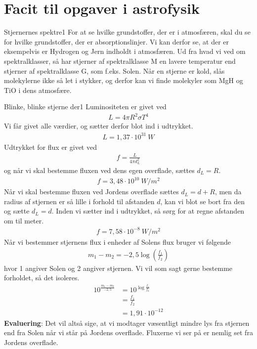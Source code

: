 \chapter{Facit til opgaver i astrofysik}

\begin{opgave}{Stjernernes spektre}{1}
\opg For at se hvilke grundstoffer, der er i atmosfæren, skal du se for hvilke grundstoffer, der er absorptionslinjer. Vi kan derfor se, at der er eksempelvis er Hydrogen og Jern indholdt i atmosfæren.
\opg Ud fra hvad vi ved om spektralklasser, så har stjerner af spektralklasse M en lavere temperatur end stjerner af spektralklasse G, som f.eks. Solen. Når en stjerne er kold, slås molekylerne ikke så let i stykker, og derfor kan vi finde molekyler som MgH og TiO i dens atmosfære. 
\end{opgave}



\begin{opgave}{Blinke, blinke stjerne der}{1}
  \opg Luminositeten er givet ved 
  \begin{align*}
  L = 4\pi R^2 \sigma T^4 
  \end{align*}
  Vi får givet alle værdier, og sætter derfor blot ind i udtrykket. 
  \begin{align*}
  L = 1,37 \cdot 10^{31}~\si{W}
  \end{align*}
  \opg Udtrykket for flux er givet ved 
  \begin{align*}
  f = \frac{L}{4\pi d_L^2}
  \end{align*}
  og når vi skal bestemme fluxen ved dens egen overflade, sættes $d_L = R$. 
  \begin{align*}
  f = 3,48\cdot 10^{10}~\si{W/m^2}
  \end{align*}
  \opg Når vi skal bestemme fluxen ved Jordens overflade sættes $d_L = d+R$, men da radius af stjernen er så lille i forhold til afstanden $d$, kan vi blot se bort fra den og sætte $d_L = d$. Inden vi sætter ind i udtrykket, så sørg for at regne afstanden om til meter.
  \begin{align*}
  f = 7,58\cdot 10^{-8}~\si{W/m^2}
  \end{align*}
  \opg Når vi bestemmer stjernens flux i enheder af Solens flux bruger vi følgende
  \begin{align*}
  m_1-m_2 = -2,5\log \left( \frac{f_1}{f_2} \right)
  \end{align*}
  hvor 1 angiver Solen og 2 angiver stjernen. Vi vil som sagt gerne bestemme forholdet, så det isoleres.  
  \begin{align*}
  10^{\frac{m_1-m_2}{-2,5}} &= 10^{\log \frac{f_1}{f_2}}\\
  &=\frac{f_1}{f_2}\\
  &=1,91\cdot 10^{-12}
  \end{align*}
  \textbf{Evaluering}: Det vil altså sige, at vi modtager væsentligt mindre lys fra stjernen end fra Solen når vi står på Jordens overflade. Fluxerne vi ser på er nemlig set fra Jordens overflade. 
\end{opgave}

